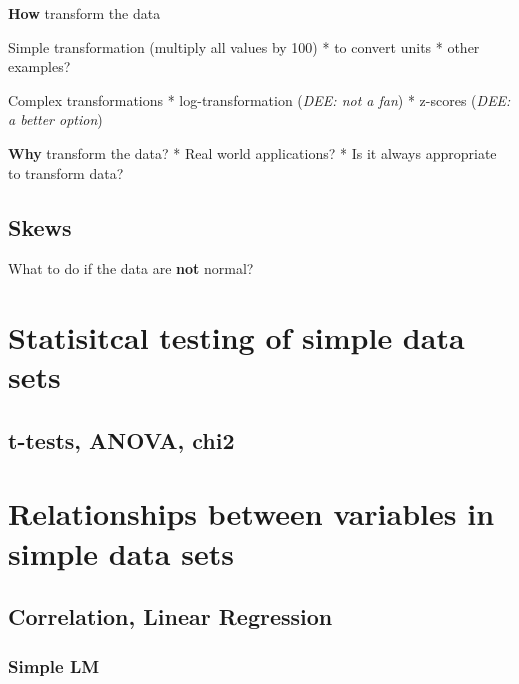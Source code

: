 \documentclass[
]{book}
\begin{document}
\textbf{How} transform the data

Simple transformation (multiply all values by 100)
* to convert units
* other examples?

Complex transformations
* log-transformation (\emph{DEE: not a fan})
* z-scores (\emph{DEE: a better option})

\textbf{Why} transform the data?
* Real world applications?
* Is it always appropriate to transform data?

\hypertarget{skews}{%
\subsection{Skews}\label{skews}}

What to do if the data are \textbf{not} normal?

\hypertarget{statisitcal-testing-of-simple-data-sets}{%
\section*{Statisitcal testing of simple data sets}\label{statisitcal-testing-of-simple-data-sets}}

\hypertarget{t-tests-anova-chi2}{%
\subsection{t-tests, ANOVA, chi2}\label{t-tests-anova-chi2}}

\hypertarget{relationships-between-variables-in-simple-data-sets}{%
\section*{Relationships between variables in simple data sets}\label{relationships-between-variables-in-simple-data-sets}}

\hypertarget{correlation-linear-regression}{%
\subsection{Correlation, Linear Regression}\label{correlation-linear-regression}}

\hypertarget{simple-lm}{%
\subsubsection{Simple LM}\label{simple-lm}}
\end{document}
